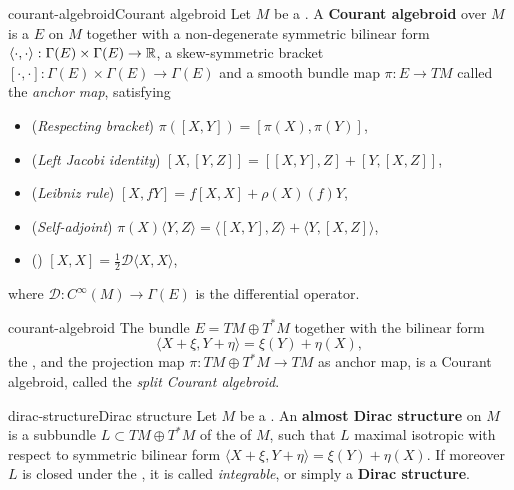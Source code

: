 \begin{topic}{courant-algebroid}{Courant algebroid}
    Let $M$ be a . A \textbf{Courant algebroid} over $M$ is a  $E$ on $M$ together with a non-degenerate symmetric bilinear form $\langle \cdot, \cdot \rangle : \Gamma(E) \times \Gamma(E) \to \mathbb{R}$, a skew-symmetric bracket $[\cdot, \cdot] : \Gamma(E) \times \Gamma(E) \to \Gamma(E)$ and a smooth bundle map $\pi : E \to TM$ called the \textit{anchor map}, satisfying
    \begin{itemize}
        \item (\textit{Respecting bracket}) $\pi([X, Y]) = [\pi(X), \pi(Y)]$,
        \item (\textit{Left Jacobi identity}) $[X, [Y, Z]] = [[X, Y], Z] + [Y, [X, Z]]$,
        \item (\textit{Leibniz rule}) $[X, fY] = f[X, X] + \rho(X)(f) Y$,
        \item (\textit{Self-adjoint}) $\pi(X) \langle Y, Z \rangle = \langle [X, Y], Z \rangle + \langle Y, [X, Z] \rangle$,
        \item (\textit{}) $[X, X] = \frac{1}{2} \mathcal{D} \langle X, X \rangle$,
    \end{itemize}
    where $\mathcal{D} : C^\infty(M) \to \Gamma(E)$ is the differential operator.
\end{topic}

\begin{example}{courant-algebroid}
    The bundle $E = TM \oplus T^*M$ together with the bilinear form
    \[ \langle X + \xi, Y + \eta \rangle = \xi(Y) + \eta(X) , \]
    the , and the projection map $\pi : TM \oplus T^*M \to TM$ as anchor map, is a Courant algebroid, called the \textit{split Courant algebroid}.
\end{example}

\begin{topic}{dirac-structure}{Dirac structure}
    Let $M$ be a . An \textbf{almost Dirac structure} on $M$ is a subbundle $L \subset TM \oplus T^*M$ of the  of $M$, such that $L$ maximal isotropic with respect to symmetric bilinear form $\langle X + \xi, Y + \eta \rangle = \xi(Y) + \eta(X)$. If moreover $L$ is closed under the , it is called \textit{integrable}, or simply a \textbf{Dirac structure}.
\end{topic}

